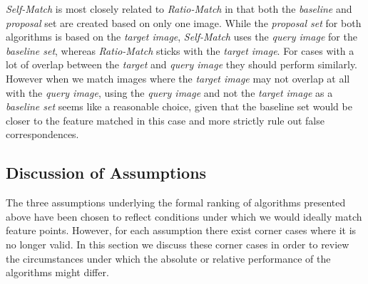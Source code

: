 \documentclass[review]{elsarticle}
\begin{document}
\emph{Self-Match} is most closely related to \emph{Ratio-Match} in that both the \emph{baseline} and \emph{proposal} set are created based on only one image. While the \emph{proposal set} for both algorithms is based on the \emph{target image}, \emph{Self-Match} uses the \emph{query image} for the \emph{baseline set}, whereas \emph{Ratio-Match} sticks with the \emph{target image}. For cases with a lot of overlap between the \emph{target} and \emph{query image} they should perform similarly. However when we match images where the \emph{target image} may not overlap at all with the \emph{query image}, using the \emph{query image} and not the \emph{target image} as a \emph{baseline set} seems like a reasonable choice, given that the baseline set would be closer to the feature matched in this case and more strictly rule out false correspondences.

\subsection{Discussion of Assumptions}
\label{ref:disc_assumptions}




The three assumptions underlying the formal ranking of algorithms presented above have been chosen to reflect conditions under which we would ideally match feature points. However, for each assumption there exist corner cases where it is no longer valid. In this section we discuss these corner cases in order to review the circumstances under which the absolute or relative performance of the algorithms might differ.
\end{document}
